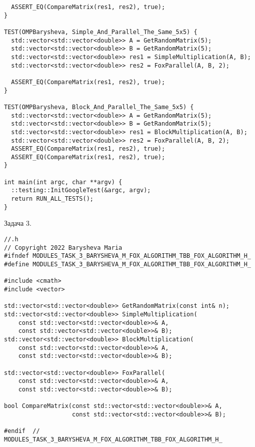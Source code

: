 \documentclass[12pt]{article}
\begin{document}
\begin{lstlisting}
  ASSERT_EQ(CompareMatrix(res1, res2), true);
}

TEST(OMPBarysheva, Simple_And_Parallel_The_Same_5x5) {
  std::vector<std::vector<double>> A = GetRandomMatrix(5);
  std::vector<std::vector<double>> B = GetRandomMatrix(5);
  std::vector<std::vector<double>> res1 = SimpleMultiplication(A, B);
  std::vector<std::vector<double>> res2 = FoxParallel(A, B, 2);

  ASSERT_EQ(CompareMatrix(res1, res2), true);
}

TEST(OMPBarysheva, Block_And_Parallel_The_Same_5x5) {
  std::vector<std::vector<double>> A = GetRandomMatrix(5);
  std::vector<std::vector<double>> B = GetRandomMatrix(5);
  std::vector<std::vector<double>> res1 = BlockMultiplication(A, B);
  std::vector<std::vector<double>> res2 = FoxParallel(A, B, 2);
  ASSERT_EQ(CompareMatrix(res1, res2), true);
  ASSERT_EQ(CompareMatrix(res1, res2), true);
}

int main(int argc, char **argv) {
  ::testing::InitGoogleTest(&argc, argv);
  return RUN_ALL_TESTS();
}
\end{lstlisting}
\par Задача 3.
\begin{lstlisting}
//.h
// Copyright 2022 Barysheva Maria
#ifndef MODULES_TASK_3_BARYSHEVA_M_FOX_ALGORITHM_TBB_FOX_ALGORITHM_H_
#define MODULES_TASK_3_BARYSHEVA_M_FOX_ALGORITHM_TBB_FOX_ALGORITHM_H_

#include <cmath>
#include <vector>

std::vector<std::vector<double>> GetRandomMatrix(const int& n);
std::vector<std::vector<double>> SimpleMultiplication(
    const std::vector<std::vector<double>>& A,
    const std::vector<std::vector<double>>& B);
std::vector<std::vector<double>> BlockMultiplication(
    const std::vector<std::vector<double>>& A,
    const std::vector<std::vector<double>>& B);

std::vector<std::vector<double>> FoxParallel(
    const std::vector<std::vector<double>>& A,
    const std::vector<std::vector<double>>& B);

bool CompareMatrix(const std::vector<std::vector<double>>& A,
                   const std::vector<std::vector<double>>& B);

#endif  // MODULES_TASK_3_BARYSHEVA_M_FOX_ALGORITHM_TBB_FOX_ALGORITHM_H_
\end{lstlisting}
\end{document}
